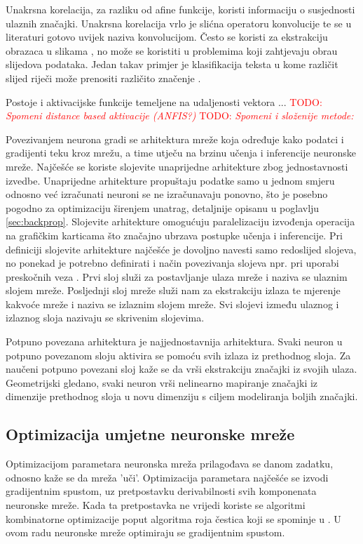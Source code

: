 \documentclass[times, utf8, numeric, diplomski]{fer}
\def\TODO#1{\noindent\textcolor{red}{TODO: \textit{#1}}\newline}
\def\todo#1{\TODO{#1}}
\begin{document}
Unakrsna korelacija, za razliku od afine funkcije, koristi informaciju o susjednosti ulaznih značajki. Unakrsna korelacija vrlo je slićna operatoru konvolucije te se u literaturi gotovo uvijek naziva konvolucijom. Često se koristi za ekstrakciju obrazaca u slikama \citep{alexnet}, no može se koristiti u problemima koji zahtjevaju obrau slijedova podataka. Jedan takav primjer je klasifikacija teksta u kome različit slijed riječi može prenositi različito značenje \citep{char_cnn}.

Postoje i aktivacijske funkcije temeljene na udaljenosti vektora ...
\todo{Spomeni distance based aktivacije (ANFIS?)}
\todo{Spomeni i složenije metode: \citep{network_in_network}}

Povezivanjem neurona gradi se arhitektura mreže koja određuje kako podatci i gradijenti teku kroz mrežu, a time utječu na brzinu učenja i inferencije neuronske mreže. Najčešće se koriste slojevite unaprijedne arhitekture zbog jednostavnosti izvedbe. Unaprijedne arhitekture propuštaju podatke samo u jednom smjeru odnosno već izračunati neuroni se ne izračunavaju ponovno, što je posebno pogodno za optimizaciju širenjem unatrag, detaljnije opisanu u poglavlju \ref{sec:backprop}. Slojevite arhitekture omogućuju paralelizaciju izvođenja operacija na grafičkim karticama što značajno ubrzava postupke učenja i inferencije. Pri definiciji slojevite arhitekture najčešće je dovoljno navesti samo redoslijed slojeva, no ponekad je potrebno definirati i način povezivanja slojeva npr. pri uporabi preskočnih veza \citep{highwaynet, resnet, densenet}. Prvi sloj služi za postavljanje ulaza mreže i naziva se ulaznim slojem mreže. Posljednji sloj mreže služi nam za ekstrakciju izlaza te mjerenje kakvoće mreže i naziva se izlaznim slojem mreže. Svi slojevi između ulaznog i izlaznog sloja nazivaju se skrivenim slojevima.

Potpuno povezana arhitektura je najjednostavnija arhitektura. Svaki neuron u potpuno povezanom sloju aktivira se pomoću svih izlaza iz prethodnog sloja. Za naučeni potpuno povezani sloj kaže se da vrši ekstrakciju značajki iz svojih ulaza. Geometrijski gledano, svaki neuron vrši nelinearno mapiranje značajki iz dimenzije prethodnog sloja u novu dimenziju s ciljem modeliranja boljih značajki.

\subsection{Optimizacija umjetne neuronske mreže}
Optimizacijom parametara neuronska mreža prilagođava se danom zadatku, odnosno kaže se da mreža 'uči'. Optimizacija parametara najčešće se izvodi gradijentnim spustom, uz pretpostavku derivabilnosti svih komponenata neuronske mreže. Kada ta pretpostavka ne vrijedi koriste se algoritmi kombinatorne optimizacije poput algoritma roja čestica koji se spominje u \citet{skripta_nenr}. U ovom radu neuronske mreže optimiraju se gradijentnim spustom.
\end{document}
